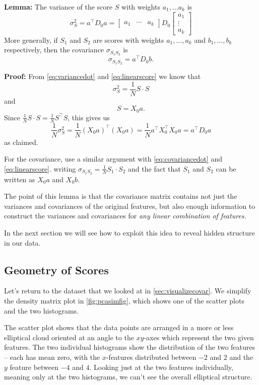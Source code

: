 \documentclass[
  oneside]{scrbook}
\begin{document}
\textbf{Lemma:} The variance of the score \(S\) with weights
\(a_1,\ldots a_k\) is \begin{equation}
\sigma_{S}^2 = a^{\intercal}D_{0}a = \left[\begin{matrix}a_{1} & \cdots & a_{k}\end{matrix}\right]D_{0}
\left[\begin{matrix} a_{1} \\ \vdots \\ a_{k}\end{matrix}\right]
\label{eq:ada}\end{equation} More generally, if \(S_{1}\) and \(S_{2}\)
are scores with weights \(a_1,\ldots, a_k\) and \(b_1,\ldots, b_k\)
respectively, then the covariance \(\sigma_{S_{1}S_{2}}\) is \[
\sigma_{S_{1}S_{2}} = a^{\intercal}D_{0}b.
\]

\textbf{Proof:} From \cref{eq:variancedot} and \ref{eq:linearscore} we
know that \[
\sigma_{S}^2 = \frac{1}{N}S\cdot S
\] and \[
S = X_{0}a.
\] Since \(\frac{1}{N}S\cdot S = \frac{1}{N}S^{\intercal}S\), this gives
us \[
\frac{1}{N}\sigma_{S}^2 = \frac{1}{N}(X_{0}a)^{\intercal}(X_{0}a) = \frac{1}{N}a^{\intercal}X_{0}^{\intercal}X_{0}a = a^{\intercal}D_{0}a
\] as claimed.

For the covariance, use a similar argument with \cref{eq:covariancedot}
and \cref{eq:linearscore}. writing
\(\sigma_{S_{1}S_{2}}=\frac{1}{N}S_{1}\cdot S_{2}\) and the fact that
\(S_{1}\) and \(S_{2}\) can be written as \(X_{0}a\) and \(X_{0}b\).

The point of this lemma is that the covariance matrix contains not just
the variances and covariances of the original features, but also enough
information to construct the variances and covariances for \emph{any
linear combination of features.}

In the next section we will see how to exploit this idea to reveal
hidden structure in our data.

\hypertarget{geometry-of-scores}{%
\subsection{Geometry of Scores}\label{geometry-of-scores}}

Let's return to the dataset that we looked at in
\cref{sec:visualizecovar}. We simplify the density matrix plot in
\cref{fig:pcasimfig}, which shows one of the scatter plots and the two
histograms.

The scatter plot shows that the data points are arranged in a more or
less elliptical cloud oriented at an angle to the \(xy\)-axes which
represent the two given features. The two individual histograms show the
distribution of the two features -- each has mean zero, with the
\(x\)-features distributed between \(-2\) and \(2\) and the \(y\)
feature between \(-4\) and \(4\). Looking just at the two features
individually, meaning only at the two histograms, we can't see the
overall elliptical structure.
\end{document}
